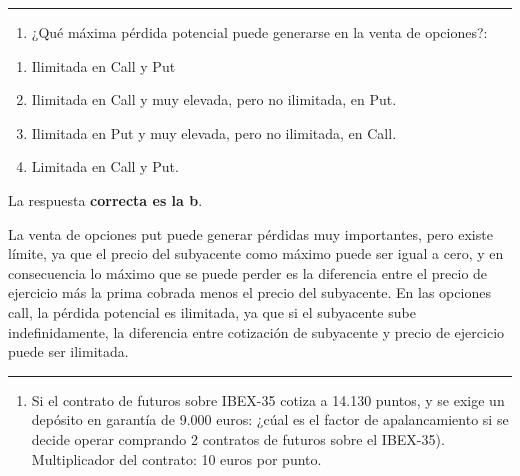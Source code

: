 \documentclass[
  letterpaper,
  DIV=11,
  numbers=noendperiod]{scrreprt}
\providecommand{\tightlist}{%
  \setlength{\itemsep}{0pt}\setlength{\parskip}{0pt}}\usepackage{longtable,booktabs,array}
\begin{document}
\begin{center}\rule{0.5\linewidth}{0.5pt}\end{center}

\begin{enumerate}
\def\labelenumi{\arabic{enumi}.}
\setcounter{enumi}{61}
\tightlist
\item
  ¿Qué máxima pérdida potencial puede generarse en la venta de
  opciones?:
\end{enumerate}

\begin{enumerate}
\def\labelenumi{\alph{enumi})}
\item
  Ilimitada en Call y Put
\item
  Ilimitada en Call y muy elevada, pero no ilimitada, en Put.
\item
  Ilimitada en Put y muy elevada, pero no ilimitada, en Call.
\item
  Limitada en Call y Put.
\end{enumerate}

\begin{tcolorbox}[enhanced jigsaw, left=2mm, opacityback=0, colback=white, breakable, arc=.35mm, bottomrule=.15mm, rightrule=.15mm, toprule=.15mm, leftrule=.75mm, colframe=quarto-callout-tip-color-frame]
\begin{minipage}[t]{5.5mm}
\textcolor{quarto-callout-tip-color}{\faLightbulb}
\end{minipage}%
\begin{minipage}[t]{\textwidth - 5.5mm}

La respuesta \textbf{correcta es la b}.

La venta de opciones put puede generar pérdidas muy importantes, pero
existe límite, ya que el precio del subyacente como máximo puede ser
igual a cero, y en consecuencia lo máximo que se puede perder es la
diferencia entre el precio de ejercicio más la prima cobrada menos el
precio del subyacente. En las opciones call, la pérdida potencial es
ilimitada, ya que si el subyacente sube indefinidamente, la diferencia
entre cotización de subyacente y precio de ejercicio puede ser
ilimitada.

\end{minipage}%
\end{tcolorbox}

\begin{center}\rule{0.5\linewidth}{0.5pt}\end{center}

\begin{enumerate}
\def\labelenumi{\arabic{enumi}.}
\setcounter{enumi}{62}
\tightlist
\item
  Si el contrato de futuros sobre IBEX-35 cotiza a 14.130 puntos, y se
  exige un depósito en garantía de 9.000 euros: ¿cúal es el factor de
  apalancamiento si se decide operar comprando 2 contratos de futuros
  sobre el IBEX-35). Multiplicador del contrato: 10 euros por punto.
\end{enumerate}
\end{document}
